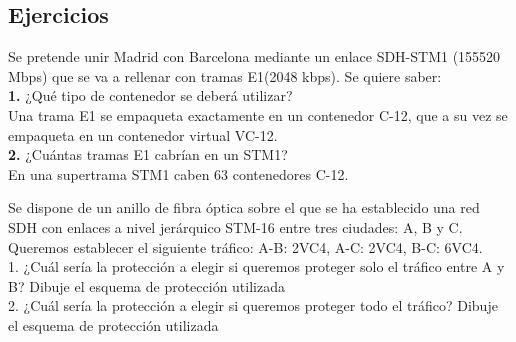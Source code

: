 \subsection{Ejercicios}
\begin{exercise}[1]
Se pretende unir Madrid con Barcelona mediante un enlace SDH-STM1 (155520 Mbps) que se va a rellenar con tramas E1(2048 kbps). Se quiere saber:\\
\textbf{1.} ¿Qué tipo de contenedor se deberá utilizar?\\
Una trama E1 se empaqueta exactamente en un contenedor C-12, que a su vez se empaqueta en un contenedor virtual VC-12.\\
\textbf{2.} ¿Cuántas tramas E1 cabrían en un STM1?\\
En una supertrama STM1 caben 63 contenedores C-12.
\end{exercise}
\begin{exercise}[2]
Se dispone de un anillo de fibra óptica sobre el que se ha establecido una red SDH con enlaces a nivel jerárquico STM-16 entre tres ciudades: A, B y C. Queremos establecer el siguiente tráfico: A-B: 2VC4, A-C: 2VC4, B-C: 6VC4.\\
1. ¿Cuál sería la protección a elegir si queremos proteger solo el tráfico entre A y B? Dibuje el esquema de protección utilizada\\
2. ¿Cuál sería la protección a elegir si queremos proteger todo el tráfico? Dibuje el esquema de protección utilizada\\
\end{exercise}
